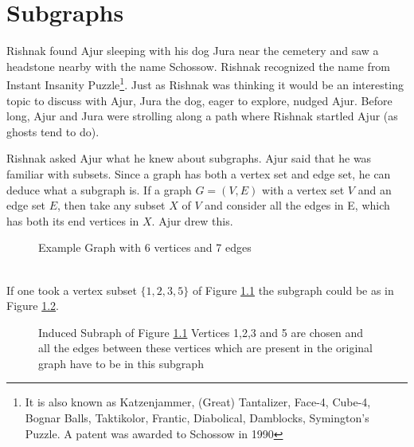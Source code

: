 \chapter{Subgraphs}
Rishnak found Ajur sleeping with his dog Jura near the cemetery and saw a headstone nearby with the name Schossow. Rishnak recognized the name  from Instant Insanity Puzzle{\footnote{It is also known as Katzenjammer, (Great) Tantalizer, Face-4, Cube-4, Bognar Balls, Taktikolor, Frantic, Diabolical, Damblocks,
Symington's Puzzle. A patent was awarded to  Schossow in 1990}}. Just as Rishnak was thinking it would be an interesting topic to discuss with Ajur, Jura the dog, eager to explore, nudged Ajur. Before long, Ajur and Jura were strolling along a path where Rishnak startled Ajur (as ghosts tend to do). 

Rishnak asked Ajur what he knew about subgraphs. Ajur said that he was familiar with subsets. Since a graph has both a vertex set and edge set, he can deduce what a subgraph is. If a graph $G=(V,E)$ with a vertex set $V$ and an edge set $E$, then take any subset $X$ of $V$ and consider all the edges in E, which has both its end vertices in $X$. Ajur drew this.
\vspace{0.2in}
\\
\noindent
\begin{figure}
\begin{center}
\caption{ Example Graph with 6 vertices and 7 edges}\label{3g}
\end{center}
\end{figure}
\\
\noindent
If one took a vertex subset $\{1,2,3,5\}$ of Figure \ref{3g} the subgraph could be as in Figure \ref{3g1}.
\begin{figure}
\begin{center}
\caption{Induced Subraph of Figure \ref{3g} Vertices 1,2,3 and 5 are chosen and all the edges between these vertices which are present in the original graph have to be in this subgraph}\label{3g1}
\end{center}
\end{figure}
